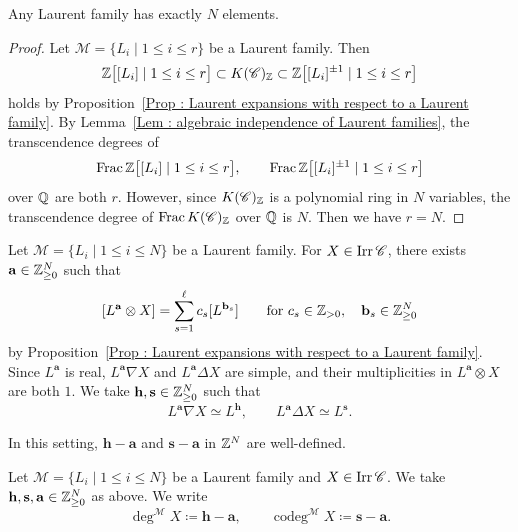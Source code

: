 \begin{Prop}
\label{Prop : cardinality of Laurent families}
Any Laurent family has exactly $N$ elements.
\end{Prop}

\begin{proof}
Let $\mathcal{M} = \{L_i \mid 1 \leq i \leq r\}$
be a Laurent family.
Then
\[
\mathbb{Z}\bigl[[L_i] \mid 1 \leq i \leq r\bigr]
\subset K(\mathscr{C})_{\mathbb{Z}}
\subset \mathbb{Z}\bigl[[L_i]^{\pm 1} \mid 1 \leq i \leq r\bigr]
\]
holds by
Proposition~\ref{Prop : Laurent expansions with respect to a Laurent family}.
By Lemma~\ref{Lem : algebraic independence of Laurent families},
the transcendence degrees of
\[
\operatorname{Frac}\mathbb{Z}\bigl[[L_i] \mid 1 \leq i \leq r\bigr],
\qquad
\operatorname{Frac}\mathbb{Z}\bigl[[L_i]^{\pm 1} \mid 1 \leq i \leq r\bigr]
\]
over $\mathbb{Q}$ are both $r$.
However, since $K(\mathscr{C})_{\mathbb{Z}}$ is a polynomial ring
in $N$ variables, the transcendence degree of
$\operatorname{Frac}K(\mathscr{C})_{\mathbb{Z}}$ over $\mathbb{Q}$ is $N$.
Then we have $r = N$.
\end{proof}

Let $\mathcal{M} = \{L_i \mid 1 \leq i \leq N\}$
be a Laurent family.
For $X \in \mathop{\mathrm{Irr}}\nolimits\mathscr{C}$,
there exists $\mathbf{a} \in \mathbb{Z}_{\geq 0}^N$ such that
\[
[L^{\mathbf{a}} \otimes X]
= \sum_{s=1}^{\ell}c_s[L^{\mathbf{b}_s}]
\qquad
\text{for }c_s \in \mathbb{Z}_{>0},\quad
\mathbf{b}_s \in \mathbb{Z}_{\geq 0}^N
\]
by
Proposition~\ref{Prop : Laurent expansions with respect to a Laurent family}.
Since $L^{\mathbf{a}}$ is real,
$L^{\mathbf{a}} \nabla X$ and $L^{\mathbf{a}} \Delta X$ are simple,
and their multiplicities in $L^{\mathbf{a}} \otimes X$ are both $1$.
We take $\mathbf{h}, \mathbf{s} \in \mathbb{Z}_{\geq 0}^N$ such that
\[
L^{\mathbf{a}} \nabla X \simeq L^{\mathbf{h}},
\qquad
L^{\mathbf{a}} \Delta X \simeq L^{\mathbf{s}}.
\]

\begin{Lem}
\label{Lem : well defined degrees for Laurent families}
In this setting, $\mathbf{h} - \mathbf{a}$ and
$\mathbf{s} - \mathbf{a}$ in $\mathbb{Z}^N$ are well-defined.
\end{Lem}

\begin{Def}
\label{Def : degrees with respect to a Laurent family}
Let $\mathcal{M} = \{L_i \mid 1 \leq i \leq N\}$
be a Laurent family and $X \in \mathop{\mathrm{Irr}}\nolimits\mathscr{C}$.
We take $\mathbf{h}, \mathbf{s}, \mathbf{a} \in \mathbb{Z}_{\geq 0}^N$
as above.
We write
\[
\deg^{\mathcal{M}}X \coloneq \mathbf{h} - \mathbf{a},
\qquad
\operatorname{codeg}^{\mathcal{M}}X
\coloneq \mathbf{s} - \mathbf{a}.
\]
\end{Def}

